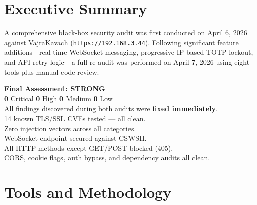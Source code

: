 \documentclass[12pt,a4paper]{article}
\begin{document}
\section{Executive Summary}

A comprehensive black-box security audit was first conducted on April 6, 2026 against VajraKavach (\texttt{https://192.168.3.44}).  Following significant feature additions---real-time WebSocket messaging, progressive IP-based TOTP lockout, and API retry logic---a full re-audit was performed on April 7, 2026 using eight tools plus manual code review.

\begin{center}
\setlength{\fboxsep}{12pt}
\colorbox{codebg}{%
\begin{minipage}{0.85\textwidth}
\centering
\textbf{\large Final Assessment: \textcolor{success}{STRONG}}\\[6pt]
\textbf{0} Critical \quad \textbf{0} High \quad \textbf{0} Medium \quad \textbf{0} Low\\[4pt]
All findings discovered during both audits were \textbf{fixed immediately}.\\
14 known TLS/SSL CVEs tested --- all clean.\\
Zero injection vectors across all categories.\\
WebSocket endpoint secured against CSWSH.\\
All HTTP methods except GET/POST blocked (405).\\
CORS, cookie flags, auth bypass, and dependency audits all clean.
\end{minipage}%
}
\end{center}

\section{Tools and Methodology}
\end{document}
